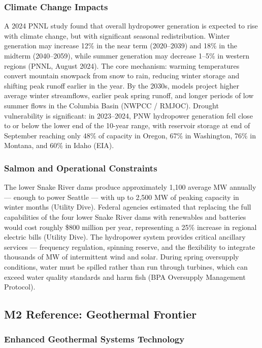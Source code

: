 \documentclass[11pt,letterpaper]{article}
\begin{document}
\subsubsection{Climate Change Impacts}

A 2024 PNNL study found that overall hydropower generation is expected to rise with climate change, but with significant seasonal redistribution. Winter generation may increase 12\% in the near term (2020--2039) and 18\% in the midterm (2040--2059), while summer generation may decrease 1--5\% in western regions (PNNL, August 2024). The core mechanism: warming temperatures convert mountain snowpack from snow to rain, reducing winter storage and shifting peak runoff earlier in the year. By the 2030s, models project higher average winter streamflows, earlier peak spring runoff, and longer periods of low summer flows in the Columbia Basin (NWPCC / RMJOC). Drought vulnerability is significant: in 2023--2024, PNW hydropower generation fell close to or below the lower end of the 10-year range, with reservoir storage at end of September reaching only 48\% of capacity in Oregon, 67\% in Washington, 76\% in Montana, and 60\% in Idaho (EIA).

\subsubsection{Salmon and Operational Constraints}

The lower Snake River dams produce approximately 1,100 average MW annually --- enough to power Seattle --- with up to 2,500 MW of peaking capacity in winter months (Utility Dive). Federal agencies estimated that replacing the full capabilities of the four lower Snake River dams with renewables and batteries would cost roughly \$800 million per year, representing a 25\% increase in regional electric bills (Utility Dive). The hydropower system provides critical ancillary services --- frequency regulation, spinning reserve, and the flexibility to integrate thousands of MW of intermittent wind and solar. During spring oversupply conditions, water must be spilled rather than run through turbines, which can exceed water quality standards and harm fish (BPA Oversupply Management Protocol).

\subsection{M2 Reference: Geothermal Frontier}

\subsubsection{Enhanced Geothermal Systems Technology}
\end{document}
